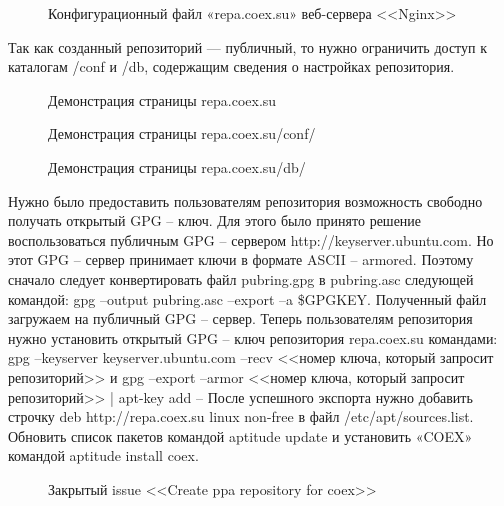 \begin{figure}[h!]
\caption{ Конфигурационный файл «repa.coex.su» веб-сервера <<Nginx>> }
\label{kucher_6:kucher_6}
\end{figure}
	
	Так как созданный репозиторий --- публичный, то нужно ограничить доступ к каталогам /conf и /db, содержащим сведения о настройках репозитория.
	
\begin{figure}[h!]
\caption{ Демонстрация страницы repa.coex.su }
\label{kucher_7:kucher_7}
\end{figure}
	
\begin{figure}[h!]
\caption{ Демонстрация страницы repa.coex.su/conf/ }
\label{kucher_8:kucher_8}
\end{figure}
	
\begin{figure}[h!]
\caption{ Демонстрация страницы repa.coex.su/db/ }
\label{kucher_9:kucher_9}
\end{figure}
	
	
	Нужно было предоставить пользователям репозитория возможность свободно получать открытый GPG – ключ. Для этого было принято решение воспользоваться публичным GPG – сервером http://keyserver.ubuntu.com. Но этот GPG – сервер принимает ключи в формате ASCII – armored. Поэтому сначало следует конвертировать файл pubring.gpg в pubring.asc следующей командой: gpg –output pubring.asc –export –a \$GPGKEY. Полученный файл загружаем на публичный GPG – сервер.
	Теперь пользователям репозитория нужно установить открытый GPG – ключ репозитория repa.coex.su командами: gpg --keyserver keyserver.ubuntu.com --recv <<номер ключа, который запросит репозиторий>> и gpg --export --armor <<номер ключа, который запросит репозиторий>> | apt-key add –
	После успешного экспорта нужно добавить строчку deb http://repa.coex.su linux non-free в файл /etc/apt/sources.list.
	Обновить список пакетов командой aptitude update и установить «COEX» командой aptitude install coex.
	
	\cite{nixp} 
	\cite{anosov} 
	
\begin{figure}[h!]
\caption{ Закрытый issue <<Create ppa repository for coex>> }
\label{kucher_10:kucher_10}
\end{figure}


\clearpage







